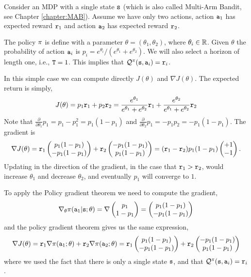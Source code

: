 \begin{example}\label{example:mab_pg}
Consider an MDP with a single state ${\tt s}$ (which is also called
Multi-Arm Bandit, see
Chapter \ref{chapter:MAB}).
Assume we have only two actions, action ${\tt a}_1$ has expected
reward ${\tt r}_1$ and action ${\tt a}_2$ has expected reward
${\tt r}_2$.

The policy $\pi$ is define with a parameter
$\theta=(\theta_1,\theta_2)$, where $\theta_i\in \mathbb{R}$. Given
$\theta$ the probability of action ${\tt a}_i$ is
$p_i=e^{\theta_i}/(e^{\theta_1}+e^{\theta_2})$. We will also select
a horizon of length one, i.e., ${\tt T}=1$. This implies that
$\mathcal{Q}^\pi({\tt s},{\tt a}_i)={\tt r}_i$.

In this simple case we can compute directly $J(\theta)$ and $\nabla
J(\theta)$. The expected return is simply,
\[
J(\theta)=p_1 {\tt r}_1 + p_2 {\tt r}_2 =
\frac{e^{\theta_1}}{e^{\theta_1}+e^{\theta_2}} {\tt r}_1 +
\frac{e^{\theta_2}}{e^{\theta_1}+e^{\theta_2}} {\tt r}_2
\]
Note that $\frac{\partial}{\partial \theta_1} p_1=
p_1-p_1^2=p_1(1-p_1) $ and $\frac{\partial }{\partial \theta_2} p_1=
- p_1 p_2= -p_1(1-p_1)$. The gradient is
\[
\nabla J(\theta)= {\tt r}_1 \begin{pmatrix} p_1(1-p_1)\\
-p_1(1-p_1)\end{pmatrix} + {\tt r}_2 \begin{pmatrix} -p_1(1-p_1)\\
p_1(1-p_1)\end{pmatrix} = ({\tt r}_1-{\tt r}_2) p_1(1-p_1) \begin{pmatrix}+1\\
-1\end{pmatrix}.
\]
Updating in the direction of the gradient, in the case that
${\tt r}_1>{\tt r}_2$, would increase $\theta_1$ and decrease
$\theta_2$, and eventually $p_1$ will converge to $1$.

To apply the Policy gradient theorem we need to compute the
gradient,
\[
\nabla_\theta \pi({\tt a}_1|{\tt s};\theta) = \nabla \begin{pmatrix} p_1\\
1-p_1\end{pmatrix}=  \begin{pmatrix} p_1(1-p_1)\\
-p_1(1-p_1)\end{pmatrix}
\]
and the policy gradient theorem gives us the same expression,
\[
\nabla J(\theta) = {\tt r}_1 \nabla
\pi({\tt a}_1;\theta)+{\tt r}_2 \nabla
\pi({\tt a}_2;\theta)={\tt r}_1 \begin{pmatrix} p_1(1-p_1)\\
-p_1(1-p_1)\end{pmatrix} + {\tt r}_2 \begin{pmatrix} -p_1(1-p_1)\\
p_1(1-p_1)\end{pmatrix}
\]
where we used the fact that there is only a single state ${\tt s}$,
and that $\mathcal{Q}^\pi({\tt s},{\tt a}_i)={\tt r}_i$.
\end{example}

